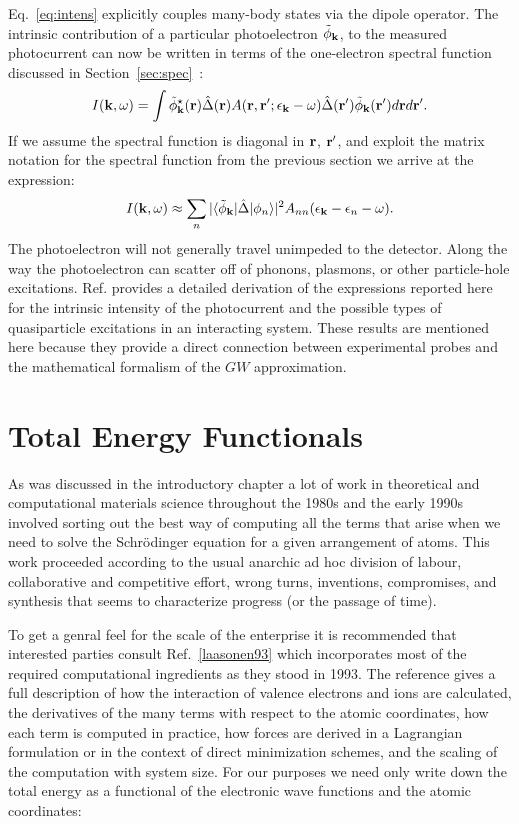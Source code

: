 Eq.~\ref{eq:intens} explicitly couples many-body states via the dipole operator.
The intrinsic contribution of a particular photoelectron $\tilde{\phi}_{{\bf k}}$, to the measured photocurrent
can now be written in terms of the one-electron spectral
function discussed in Section~\ref{sec:spec}~\cite{bardy85}:
%
\begin{equation}
\label{eq:barhed}
I({\bf k},\omega)=\int \tilde{\phi}^{\star}_{{\bf k}}({\bf r})\hat{\Delta}({\bf r})A({\bf r},{\bf r}';\epsilon_{\bf k}-\omega)\hat{\Delta}({\bf r}')\tilde{\phi}_{{\bf k}}({\bf r}')d{\bf r} d{\bf r}'.
\end{equation}
%
If we assume the spectral function is diagonal in ${\bf r}$, ${\bf r}'$, and exploit the matrix
notation for the spectral function from the previous section we arrive at the expression:
%
\begin{equation}
I({\bf k},\omega) \approx \sum_{n} |\langle\tilde{\phi}_{{\bf k}}|\hat{\Delta}|\phi_{n}\rangle|^{2} A_{nn}(\epsilon_{{\bf k}}-\epsilon_{n}-\omega).
\end{equation}
%
The photoelectron will not generally travel unimpeded to the detector. 
Along the way the photoelectron can scatter off of phonons, plasmons, 
or other particle-hole excitations.
Ref. \cite{bardy85} provides a detailed derivation of the 
expressions reported here for the intrinsic intensity
of the photocurrent and the possible types of quasiparticle 
excitations in an interacting system.
These results are mentioned here because they provide a direct 
connection between experimental probes and the mathematical 
formalism of the $GW$ approximation.

\section{Total Energy Functionals}
As was discussed in the introductory chapter 
a lot of work in theoretical and computational 
materials science throughout the 1980s and the early 1990s
involved sorting out the best way of computing all the terms that arise
when we need to solve the Schr\"odinger equation for a given arrangement
of atoms. This work proceeded according to the usual anarchic ad hoc division of labour, 
collaborative and competitive effort, wrong turns, inventions, compromises, and synthesis 
that seems to characterize progress (or the passage of time).

To get a genral feel for the scale of the enterprise it is recommended that interested 
parties consult Ref.~\ref{laasonen93} which incorporates most of the required
computational ingredients as they stood in 1993.
The reference gives a full description of how the interaction of valence electrons 
and ions are calculated, the derivatives of the many terms with 
respect to the atomic coordinates, how each term is computed in practice, 
how forces are derived in a Lagrangian formulation or in the context 
of direct minimization schemes, and the scaling of the computation with system size.
For our purposes we need only write down the total energy as a functional of
the electronic wave functions and the atomic coordinates:

